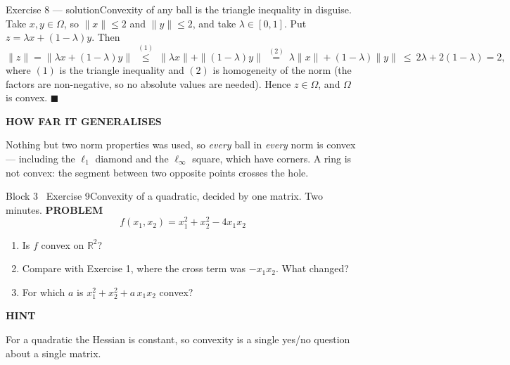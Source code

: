 \documentclass[aspectratio=169,11pt]{beamer}
\newcommand{\kicker}[1]{{\color{hseaccent}\scriptsize\bfseries\MakeUppercase{#1}}}
\newcommand{\takeaway}[2]{%
  \par\smallskip\noindent
  \colorbox{hselight}{\parbox{\dimexpr\textwidth-2\fboxsep}{%
    \kicker{#1}\par\vspace{0.12em}\footnotesize #2}}\par}
\begin{document}
\begin{frame}{Exercise 8 --- solution}{Convexity of any ball is the triangle inequality in disguise.}
  \vspace{0.4em}
  Take $x,y\in\Omega$, so $\|x\|\le2$ and $\|y\|\le2$, and take $\lambda\in[0,1]$. Put
  $z=\lambda x+(1-\lambda)y$. Then
  \[ \|z\|=\|\lambda x+(1-\lambda)y\|
    \ \overset{(1)}{\le}\ \|\lambda x\|+\|(1-\lambda)y\|
    \ \overset{(2)}{=}\ \lambda\|x\|+(1-\lambda)\|y\|
    \ \le\ 2\lambda+2(1-\lambda)=2, \]
  where $(1)$ is the triangle inequality and $(2)$ is homogeneity of the norm (the factors are non-negative,
  so no absolute values are needed). Hence $z\in\Omega$, and $\Omega$ is convex. $\blacksquare$
  \vspace{0.5em}
  \takeaway{how far it generalises}{Nothing but two norm properties was used, so \emph{every} ball in
    \emph{every} norm is convex --- including the $\ell_1$ diamond and the $\ell_\infty$ square, which have
    corners. A ring is not convex: the segment between two opposite points crosses the hole.}
\end{frame}

\begin{frame}{Block 3 \textperiodcentered\ Exercise 9}{Convexity of a quadratic, decided by one matrix. Two minutes.}
  \vspace{0.6em}
  \kicker{problem}
  \[ f(x_1,x_2)=x_1^{2}+x_2^{2}-4x_1x_2 \]
  \vspace{-0.5em}
  \begin{enumerate}\small
    \item Is $f$ convex on $\mathbb{R}^2$?
    \item Compare with Exercise 1, where the cross term was $-x_1x_2$. What changed?
    \item For which $a$ is $x_1^{2}+x_2^{2}+a\,x_1x_2$ convex?
  \end{enumerate}
  \vspace{0.5em}
  \takeaway{hint}{For a quadratic the Hessian is constant, so convexity is a single yes/no question about a
    single matrix.}
\end{frame}
\end{document}

